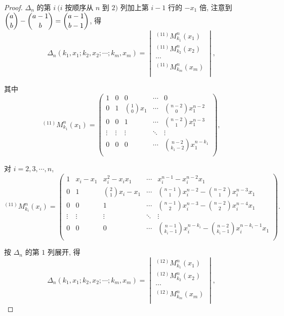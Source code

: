 \documentclass{ctexart}
\begin{document}
\begin{proof}
    $\Delta_n$ 的第 $i\ (i$ 按顺序从 $n$ 到 $2)$ 列加上第 $i-1$ 行的 $-x_1$ 倍, 注意到 $\dbinom{a}{b}-\dbinom{a-1}{b}=\dbinom{a-1}{b-1}$, 得
    \[\Delta_n(k_1,x_1;k_2,x_2;\cdots;k_m,x_m)=\begin{vmatrix}
        ^{(11)}M_{k_1}^n(x_1) \\
        ^{(11)}M_{k_2}^n(x_2) \\
        \cdots \\
        ^{(11)}M_{k_m}^n(x_m) \\
    \end{vmatrix},\]

    其中
    \[^{(11)}M_{k_1}^n(x_1)=\begin{pmatrix}
        1 & 0 & 0 & \cdots & 0 \\[4pt]
        0 & 1 & \binom{1}{0}x_1 & \cdots & \binom{n-2}{0}x_1^{n-2} \\[10pt]
        0 & 0 & 1 & \cdots & \binom{n-2}{1}x_1^{n-3} \\
        \vdots & \vdots & \vdots & \ddots & \vdots \\[4pt]
        0 & 0 & 0 & \cdots & \binom{n-2}{k_1-2}x_1^{n-k_1} \\
    \end{pmatrix},\]

    对 $i=2,3,\cdots,n$,
    \[^{(11)}M_{k_i}^n(x_i)=\begin{pmatrix}
        1 & x_i-x_1 & x_i^2-x_ix_1 & \cdots & x_i^{n-1}-x_i^{n-2}x_1 \\[4pt]
        0 & 1 & \binom{2}{1}x_i-x_1 & \cdots & \binom{n-1}{1}x_i^{n-2}-\binom{n-2}{1}x_i^{n-3}x_1 \\[10pt]
        0 & 0 & 1 & \cdots & \binom{n-1}{2}x_i^{n-3}-\binom{n-2}{2}x_i^{n-4}x_1 \\
        \vdots & \vdots & \vdots & \ddots & \vdots \\[4pt]
        0 & 0 & 0 & \cdots & \binom{n-1}{k_i-1}x_i^{n-k_i}-\binom{n-2}{k_i-1}x_i^{n-k_i-1}x_1 \\
    \end{pmatrix}.\]

    按 $\Delta_n$ 的第 $1$ 列展开, 得
    \[\Delta_n(k_1,x_1;k_2,x_2;\cdots;k_m,x_m)=\begin{vmatrix}
        ^{(12)}M_{k_1}^n(x_1) \\
        ^{(12)}M_{k_2}^n(x_2) \\
        \cdots \\
        ^{(12)}M_{k_m}^n(x_m) \\
    \end{vmatrix},\]


\end{proof}
\end{document}
